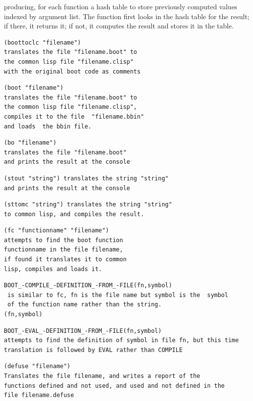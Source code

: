 \documentclass{article}
\begin{document}
producing, for each function a
hash table to store previously computed values indexed by argument
list.  The function first looks in the hash table for the result;
if there, it returns it; if not, it computes the result and stores it in the
table.

\begin{verbatim}
(boottoclc "filename")
translates the file "filename.boot" to
the common lisp file "filename.clisp"
with the original boot code as comments
\end{verbatim}

\begin{verbatim}
(boot "filename")
translates the file "filename.boot" to
the common lisp file "filename.clisp",
compiles it to the file  "filename.bbin"
and loads  the bbin file.
\end{verbatim}

\begin{verbatim}
(bo "filename")
translates the file "filename.boot"
and prints the result at the console
\end{verbatim}

\begin{verbatim}
(stout "string") translates the string "string"
and prints the result at the console
\end{verbatim}

\begin{verbatim}
(sttomc "string") translates the string "string"
to common lisp, and compiles the result.
\end{verbatim}

\begin{verbatim}
(fc "functionname" "filename")
attempts to find the boot function
functionname in the file filename,
if found it translates it to common
lisp, compiles and loads it.
\end{verbatim}

\begin{verbatim}
BOOT_-COMPILE_-DEFINITION_-FROM_-FILE(fn,symbol)
 is similar to fc, fn is the file name but symbol is the  symbol
 of the function name rather than the string.
(fn,symbol)
\end{verbatim}

\begin{verbatim}
BOOT_-EVAL_-DEFINITION_-FROM_-FILE(fn,symbol)
attempts to find the definition of symbol in file fn, but this time
translation is followed by EVAL rather than COMPILE
\end{verbatim}

\begin{verbatim}
(defuse "filename")
Translates the file filename, and writes a report of the
functions defined and not used, and used and not defined in the
file filename.defuse
\end{verbatim}
\end{document}
